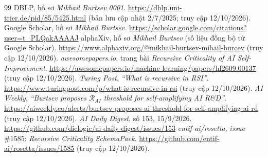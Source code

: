 \documentclass[12pt,a4paper,openany]{report}
\numberwithin{equation}{chapter}   %
\theoremstyle{definition}
\newcommand{\en}[1]{\textit{#1}}   %
\begin{document}
\begin{thebibliography}{99}
 DBLP, hồ sơ \en{Mikhail Burtsev 0001}. \url{https://dblp.uni-trier.de/pid/85/5425.html} (bản lưu cập nhật 2/7/2025; truy cập 12/10/2026).
 Google Scholar, hồ sơ \en{Mikhail Burtsev}. \url{https://scholar.google.com/citations?user=t_PLQakAAAAJ}
 alphaXiv, hồ sơ \en{Mikhail Burtsev} (số liệu đồng bộ từ Google Scholar). \url{https://www.alphaxiv.org/@mikhail-burtsev-mihail-burcev} (truy cập 12/10/2026).
 \en{awesomepapers.io}, trang bài \en{Recursive Criticality of AI Self-Improvement}. \url{https://awesomepapers.io/machine-learning/papers/hf2609.00137} (truy cập 12/10/2026).
 \en{Turing Post}, \en{``What is recursive in RSI''}. \url{https://www.turingpost.com/p/what-is-recursive-in-rsi} (truy cập 12/10/2026).
 \en{AI Weekly}, \en{``Burtsev proposes $\mathcal{R}_{AI}$ threshold for self-amplifying AI R\&D''}. \url{https://aiweekly.co/alerts/burtsev-proposes-ai-threshold-for-self-amplifying-ai-rd} (truy cập 12/10/2026).
 \en{AI Daily Digest}, số 153, 15/9/2026. \url{https://github.com/diclogic/ai-daily-digest/issues/153}
 \en{entif-ai/rosetta}, \en{issue} \#1585: \en{Recursive Criticality SchemaPack}. \url{https://github.com/entif-ai/rosetta/issues/1585} (truy cập 12/10/2026).
\end{thebibliography}
\end{document}
